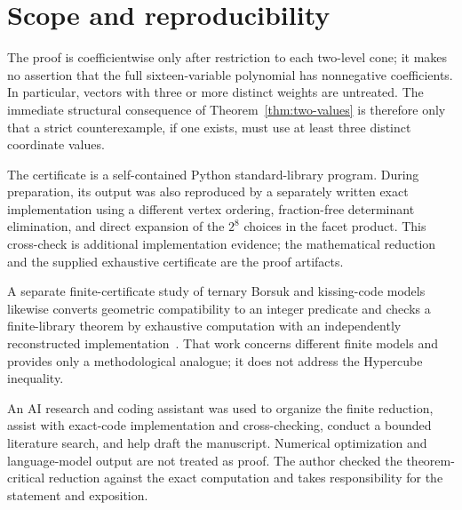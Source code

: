 \documentclass[11pt]{article}
\begin{document}
\section{Scope and reproducibility}

The proof is coefficientwise only after restriction to each two-level cone;
it makes no assertion that the full sixteen-variable polynomial has
nonnegative coefficients.  In particular, vectors with three or more
distinct weights are untreated.  The immediate structural consequence of
Theorem~\ref{thm:two-values} is therefore only that a strict counterexample,
if one exists, must use at least three distinct coordinate values.

The certificate is a self-contained Python standard-library program.  During
preparation, its output was also reproduced by a separately written exact
implementation using a different vertex ordering, fraction-free determinant
elimination, and direct expansion of the $2^8$ choices in the facet product.
This cross-check is additional implementation evidence; the mathematical
reduction and the supplied exhaustive certificate are the proof artifacts.

A separate finite-certificate study of ternary Borsuk and kissing-code models
likewise converts geometric compatibility to an integer predicate and checks a
finite-library theorem by exhaustive computation with an independently
reconstructed implementation~\cite[Section~4, Lemma~3 and
Proposition~1]{202608.1658}.  That work concerns different finite models and
provides only a methodological analogue; it does not address the Hypercube
inequality.

An AI research and coding assistant was used to organize the finite
reduction, assist with exact-code implementation and cross-checking, conduct
a bounded literature search, and help draft the manuscript.  Numerical
optimization and language-model output are not treated as proof.  The author
checked the theorem-critical reduction against the exact computation and
takes responsibility for the statement and exposition.



\end{document}
